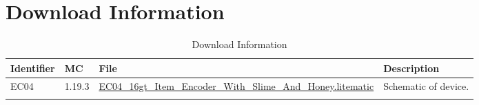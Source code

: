 \documentclass[10pt]{datasheet}
\begin{document}
\section{Download Information}
\begin{table}[h]
    \caption{Download Information}
    \begin{tabularx}{\textwidth}{l | l | l | X}
        \thickhline
        \textbf{Identifier} & \textbf{MC} & \textbf{File} & \textbf{Description} \\
        \hline
        EC04 & 1.19.3 & \href{https://github.com/Soontech-Annals/Archive/blob/63c9ea8c34519ca4eb58649773e0c37e7e462fdd/Archive/encoders/EC04\%2016gt\%20Item\%20Encoder\%20With\%20Slime\%20And\%20Honey/EC04\_16gt\_Item\_Encoder\_With\_Slime\_And\_Honey.litematic?raw=1}{EC04\_16gt\_Item\_Encoder\_With\_Slime\_And\_Honey.litematic} & Schematic of device. \\
        \hline
        \thickhline
    \end{tabularx}
\end{table}
\end{document}

